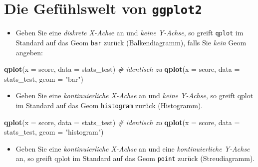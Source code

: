 \documentclass[12pt,ngerman,]{book}
\makeatletter
\newenvironment{Shaded}{\begin{snugshade}}{\end{snugshade}}
\newcommand{\KeywordTok}[1]{\textcolor[rgb]{0.13,0.29,0.53}{\textbf{{#1}}}}
\newcommand{\DataTypeTok}[1]{\textcolor[rgb]{0.13,0.29,0.53}{{#1}}}
\newcommand{\StringTok}[1]{\textcolor[rgb]{0.31,0.60,0.02}{{#1}}}
\newcommand{\CommentTok}[1]{\textcolor[rgb]{0.56,0.35,0.01}{\textit{{#1}}}}
\newcommand{\NormalTok}[1]{{#1}}
\providecommand{\tightlist}{%
  \setlength{\itemsep}{0pt}\setlength{\parskip}{0pt}}
\newenvironment{kframe}{%
\medskip{}
\setlength{\fboxsep}{.8em}
 \def\at@end@of@kframe{}%
 \ifinner\ifhmode%
  \def\at@end@of@kframe{\end{minipage}}%
  \begin{minipage}{\columnwidth}%
 \fi\fi%
 \def\FrameCommand##1{\hskip\@totalleftmargin \hskip-\fboxsep
 \colorbox{shadecolor}{##1}\hskip-\fboxsep
     \hskip-\linewidth \hskip-\@totalleftmargin \hskip\columnwidth}%
 \MakeFramed {\advance\hsize-\width
   \@totalleftmargin\z@ \linewidth\hsize
   \@setminipage}}%
 {\par\unskip\endMakeFramed%
 \at@end@of@kframe}
\renewenvironment{Shaded}{\begin{kframe}}{\end{kframe}}
\theoremstyle{definition}
\theoremstyle{definition}
\theoremstyle{remark}
\makeatother
\begin{document}
\section{\texorpdfstring{Die Gefühlswelt von
\texttt{ggplot2}}{Die Gefühlswelt von ggplot2}}\label{die-gefuhlswelt-von-ggplot2}

\begin{itemize}
\tightlist
\item
  Geben Sie eine \emph{diskrete X-Achs}e an und \emph{keine Y-Achse}, so
  greift \texttt{qplot} im Standard auf das Geom \texttt{bar} zurück
  (Balkendiagramm), falls Sie \emph{kein} Geom angeben:
\end{itemize}

\begin{Shaded}
\begin{Highlighting}[]
\KeywordTok{qplot}\NormalTok{(}\DataTypeTok{x =} \NormalTok{score, }\DataTypeTok{data =} \NormalTok{stats_test)  }\CommentTok{# identisch zu}
\KeywordTok{qplot}\NormalTok{(}\DataTypeTok{x =} \NormalTok{score, }\DataTypeTok{data =} \NormalTok{stats_test, }\DataTypeTok{geom =} \StringTok{"bar"}\NormalTok{)}
\end{Highlighting}
\end{Shaded}

\begin{itemize}
\tightlist
\item
  Geben Sie eine \emph{kontinuierliche X-Achse} an und \emph{keine
  Y-Achse}, so greift qplot im Standard auf das Geom \texttt{histogram}
  zurück (Histogramm).
\end{itemize}

\begin{Shaded}
\begin{Highlighting}[]
\KeywordTok{qplot}\NormalTok{(}\DataTypeTok{x =} \NormalTok{score, }\DataTypeTok{data =} \NormalTok{stats_test)  }\CommentTok{# identisch zu}
\KeywordTok{qplot}\NormalTok{(}\DataTypeTok{x =} \NormalTok{score, }\DataTypeTok{data =} \NormalTok{stats_test, }\DataTypeTok{geom =} \StringTok{"histogram"}\NormalTok{)}
\end{Highlighting}
\end{Shaded}

\begin{itemize}
\tightlist
\item
  Geben Sie eine \emph{kontinuierliche X-Achse} an und eine
  \emph{kontinuierliche Y-Achse} an, so greift qplot im Standard auf das
  Geom \texttt{point} zurück (Streudiagramm).
\end{itemize}
\end{document}
